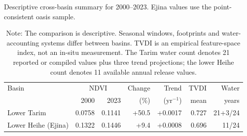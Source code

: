 \documentclass[12pt,a4paper]{article}
\begin{document}
\begin{table}[H]
	\centering
	\caption{Descriptive cross-basin summary for 2000--2023. Ejina values use the point-consistent oasis sample.}
	\label{tab:s6_cross_basin}
	\small
	\begin{tabular}{@{}lrrrrrr@{}}
		\toprule
		Basin & \multicolumn{2}{c}{NDVI} & Change & Trend & TVDI & Water \\
		\cmidrule(lr){2-3}
		 & 2000 & 2023 & (\%) & (yr$^{-1}$) & mean & years \\
		\midrule
		Lower Tarim & 0.0758 & 0.1141 & +50.5 & +0.0017 & 0.727 & 21+3/24 \\
		Lower Heihe (Ejina) & 0.1322 & 0.1446 & +9.4 & +0.0008 & 0.696 & 11/24 \\
		\bottomrule
	\end{tabular}
	\caption*{Note: The comparison is descriptive. Seasonal windows, footprints and water-accounting systems differ between basins. TVDI is an empirical feature-space index, not an in-situ measurement. The Tarim water count denotes 21 reported or compiled values plus three trend projections; the lower Heihe count denotes 11 available annual release values.}
\end{table}
\end{document}
